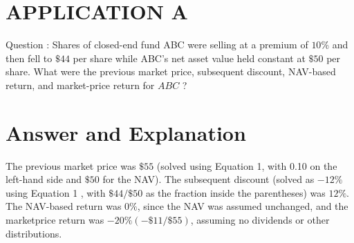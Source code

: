 \documentclass[11pt]{article}
\begin{document}
\section*{APPLICATION A}
Question : Shares of closed-end fund ABC were selling at a premium of $10 \%$ and then fell to $\$ 44$ per share while ABC's net asset value held constant at $\$ 50$ per share. What were the previous market price, subsequent discount, NAV-based return, and market-price return for $A B C$ ?

\section*{Answer and Explanation}
The previous market price was $\$ 55$ (solved using Equation 1, with 0.10 on the left-hand side and $\$ 50$ for the NAV). The subsequent discount (solved as $-12 \%$ using Equation 1 , with $\$ 44 / \$ 50$ as the fraction inside the parentheses) was $12 \%$. The NAV-based return was $0 \%$, since the NAV was assumed unchanged, and the marketprice return was $-20 \%(-\$ 11 / \$ 55)$, assuming no dividends or other distributions.
\end{document}
